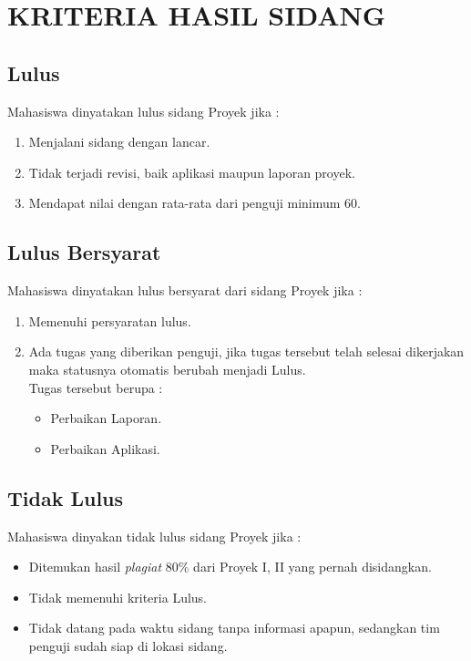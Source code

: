 \chapter{KRITERIA HASIL SIDANG}

\section{Lulus}
Mahasiswa	dinyatakan	lulus	sidang Proyek	jika	:
\begin{enumerate}
	\item Menjalani	sidang dengan	lancar.
	\item Tidak	terjadi	revisi,	baik aplikasi	maupun	laporan	proyek.
	\item Mendapat	nilai	dengan	rata-rata	dari	penguji	minimum	60.	
\end{enumerate}

\section{Lulus Bersyarat}
Mahasiswa	dinyatakan	lulus	bersyarat	dari	sidang Proyek	jika	:
\begin{enumerate}
\item Memenuhi	persyaratan	lulus.
\item Ada	 tugas	 yang	 diberikan	 penguji,	 jika	 tugas	 tersebut	 	 telah	 selesai	 dikerjakan	 maka	
statusnya	otomatis	berubah	menjadi	Lulus.	\\
Tugas	tersebut	berupa	:
\begin{itemize}
\item Perbaikan Laporan.
\item Perbaikan Aplikasi.
\end{itemize}
\end{enumerate}

\section{Tidak Lulus}
Mahasiswa	dinyakan	tidak	lulus	sidang Proyek	jika	:
\begin{itemize}
\item Ditemukan	hasil \textit{plagiat} 80\%	dari	Proyek	I,	II	yang	pernah	disidangkan.
\item Tidak	memenuhi	kriteria	Lulus.
\item Tidak	datang	pada	waktu	sidang	 tanpa	informasi	apapun,	sedangkan	 tim	penguji	sudah	siap	di	lokasi	sidang.
\end{itemize}

